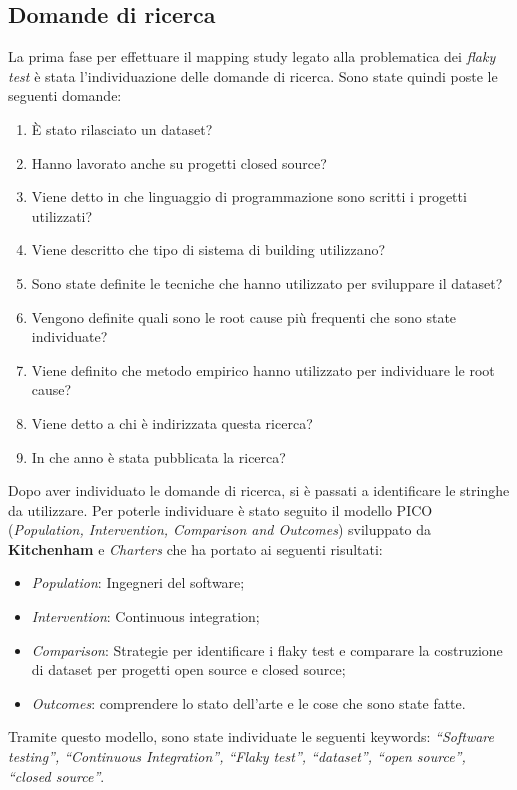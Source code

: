 \subsection{Domande di ricerca}
La prima fase per effettuare il mapping study legato alla problematica dei \emph{flaky test} è stata l’individuazione delle domande di ricerca. Sono state quindi poste
le seguenti domande:
\begin{enumerate}[start=0,label={(\bfseries RQ\arabic*):}]
	\item È stato rilasciato un dataset?
	\item Hanno lavorato anche su progetti closed source?
	\item Viene detto in che linguaggio di programmazione sono scritti i progetti utilizzati?
	\item Viene descritto che tipo di sistema di building utilizzano?
	\item Sono state definite le tecniche che hanno utilizzato per sviluppare il dataset?
	\item Vengono definite quali sono le root cause più frequenti che sono state individuate?
	\item Viene definito che metodo empirico hanno utilizzato per individuare le root cause?
	\item Viene detto a chi è indirizzata questa ricerca?
	\item In che anno è stata pubblicata la ricerca?
\end{enumerate}

Dopo aver individuato le domande di ricerca, si è passati a identificare le stringhe da utilizzare. Per poterle individuare è stato seguito il modello PICO (\emph{Population, Intervention, Comparison and Outcomes}) sviluppato da \textbf{Kitchenham} e \emph{Charters} che ha portato ai seguenti risultati:
\begin{itemize}
	\item \emph{Population}: Ingegneri del software;
	\item \emph{Intervention}: Continuous integration;
	\item \emph{Comparison}: Strategie per identificare i flaky test e comparare la costruzione di dataset per progetti open source e closed source;
	\item \emph{Outcomes}: comprendere lo stato dell’arte e le cose che sono state fatte.
\end{itemize}

Tramite questo modello, sono state individuate le seguenti keywords: \emph{“Software testing”, “Continuous Integration”, “Flaky test”, “dataset”, “open source”, “closed source”}.

